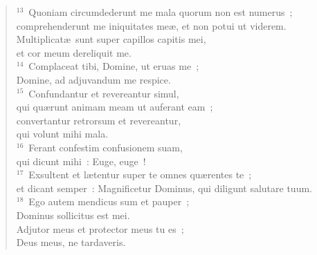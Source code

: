 \begin{flushleft}
\begin{verse}
${}^{13}$~Quoniam circumdederunt me mala quorum non est numerus~;\\ comprehenderunt me iniquitates me\ae , et non potui ut viderem.\\ Multiplicat\ae\ sunt super capillos capitis mei,\\ et cor meum dereliquit me.\\
${}^{14}$~Complaceat tibi, Domine, ut eruas me~;\\ Domine, ad adjuvandum me respice.\\
${}^{15}$~Confundantur et revereantur simul,\\ qui qu\ae runt animam meam ut auferant eam~;\\ convertantur retrorsum et revereantur,\\ qui volunt mihi mala.\\
${}^{16}$~Ferant confestim confusionem suam,\\ qui dicunt mihi~: Euge, euge~!\\
${}^{17}$~Exsultent et l\ae tentur super te omnes qu\ae rentes te~;\\ et dicant semper~: Magnificetur Dominus, qui diligunt salutare tuum.\\
${}^{18}$~Ego autem mendicus sum et pauper~;\\ Dominus sollicitus est mei.\\ Adjutor meus et protector meus tu es~;\\ Deus meus, ne tardaveris.\end{verse}\end{flushleft}



